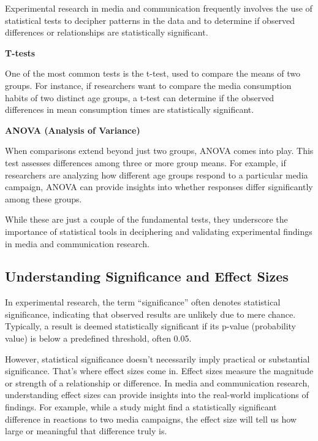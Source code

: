 \documentclass[
  b5paper]{book}
\begin{document}
Experimental research in media and communication frequently involves the use of statistical tests to decipher patterns in the data and to determine if observed differences or relationships are statistically significant.

\textbf{T-tests}

One of the most common tests is the t-test, used to compare the means of two groups. For instance, if researchers want to compare the media consumption habits of two distinct age groups, a t-test can determine if the observed differences in mean consumption times are statistically significant.

\textbf{ANOVA (Analysis of Variance)}

When comparisons extend beyond just two groups, ANOVA comes into play. This test assesses differences among three or more group means. For example, if researchers are analyzing how different age groups respond to a particular media campaign, ANOVA can provide insights into whether responses differ significantly among these groups.

While these are just a couple of the fundamental tests, they underscore the importance of statistical tools in deciphering and validating experimental findings in media and communication research.

\hypertarget{understanding-significance-and-effect-sizes}{%
\subsection*{Understanding Significance and Effect Sizes}\label{understanding-significance-and-effect-sizes}}

In experimental research, the term ``significance'' often denotes statistical significance, indicating that observed results are unlikely due to mere chance. Typically, a result is deemed statistically significant if its p-value (probability value) is below a predefined threshold, often 0.05.

However, statistical significance doesn't necessarily imply practical or substantial significance. That's where effect sizes come in. Effect sizes measure the magnitude or strength of a relationship or difference. In media and communication research, understanding effect sizes can provide insights into the real-world implications of findings. For example, while a study might find a statistically significant difference in reactions to two media campaigns, the effect size will tell us how large or meaningful that difference truly is.
\end{document}
